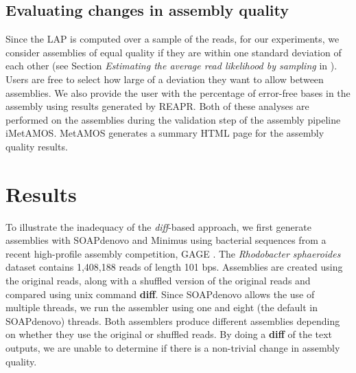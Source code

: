 



\subsection{Evaluating changes in assembly quality}
Since the LAP is computed over a sample of the reads, for our experiments, we consider assemblies of equal quality if they are within one standard deviation of each other (see Section \emph{Estimating the average read likelihood by sampling} in \cite{LAP}).
Users are free to select how large of a deviation they want to allow between assemblies.
We also provide the user with the percentage of error-free bases in the assembly using results generated by REAPR.
Both of these analyses are performed on the assemblies during the validation step of the assembly pipeline iMetAMOS\cite{koren2014automated, treangen2011metamos}.
MetAMOS generates a summary HTML page for the assembly quality results.

\section{Results}
\label{results}



To illustrate the inadequacy of the \emph{diff}-based approach, %
we first generate assemblies with SOAPdenovo and Minimus using bacterial sequences from a recent high-profile assembly competition, GAGE \cite{salzberg2012gage}.
The \emph{Rhodobacter sphaeroides} dataset contains 1,408,188 reads of length 101 bps.
Assemblies are created using the original reads, along with a shuffled version of the original reads and compared using unix command \textbf{diff}.
Since SOAPdenovo allows the use of multiple threads, we run the assembler using one and eight (the default in SOAPdenovo) threads.
Both assemblers produce different assemblies depending on whether they use the original or shuffled reads.
By doing a \textbf{diff} of the text outputs, we are unable to determine if there is a non-trivial change in assembly quality.

